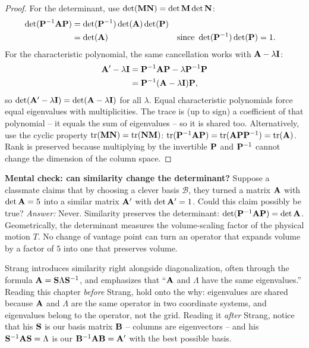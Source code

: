 \begin{proof}
For the determinant, use $\det(\mathbf{M}\mathbf{N})=\det\mathbf{M}\det\mathbf{N}$:
\begin{align*}
  \det(\mathbf{P}^{-1}\mathbf{A}\mathbf{P})
  &= \det(\mathbf{P}^{-1})\det(\mathbf{A})\det(\mathbf{P}) \\
  &= \det(\mathbf{A}) &&\text{since } \det(\mathbf{P}^{-1})\det(\mathbf{P})=1.
\end{align*}
For the characteristic polynomial, the same cancellation works with
$\mathbf{A}-\lambda\mathbf{I}$:
\begin{align*}
  \mathbf{A}'-\lambda\mathbf{I} &= \mathbf{P}^{-1}\mathbf{A}\mathbf{P}-\lambda\mathbf{P}^{-1}\mathbf{P} \\
  &= \mathbf{P}^{-1}(\mathbf{A}-\lambda\mathbf{I})\mathbf{P},
\end{align*}
so $\det(\mathbf{A}'-\lambda\mathbf{I})=\det(\mathbf{A}-\lambda\mathbf{I})$ for all $\lambda$.
Equal characteristic polynomials force equal eigenvalues with multiplicities. The
trace is (up to sign) a coefficient of that polynomial -- it equals the sum of
eigenvalues -- so it is shared too. Alternatively, use the cyclic property
$\operatorname{tr}(\mathbf{M}\mathbf{N})=\operatorname{tr}(\mathbf{N}\mathbf{M})$:
$\operatorname{tr}(\mathbf{P}^{-1}\mathbf{A}\mathbf{P})=\operatorname{tr}(\mathbf{A}\mathbf{P}\mathbf{P}^{-1})=\operatorname{tr}(\mathbf{A})$.
Rank is preserved because multiplying by the invertible $\mathbf{P}$ and $\mathbf{P}^{-1}$
cannot change the dimension of the column space.
\end{proof}

\begin{recoverybox}
\textbf{Mental check: can similarity change the determinant?}
Suppose a classmate claims that by choosing a clever basis $\mathcal{B}$, they turned a matrix $\mathbf{A}$ with $\det\mathbf{A} = 5$ into a similar matrix $\mathbf{A}'$ with $\det\mathbf{A}' = 1$. Could this claim possibly be true?
\emph{Answer:} Never. Similarity preserves the determinant: $\det(\mathbf{P}^{-1}\mathbf{A}\mathbf{P}) = \det\mathbf{A}$. Geometrically, the determinant measures the volume-scaling factor of the physical motion $T$. No change of vantage point can turn an operator that expands volume by a factor of $5$ into one that preserves volume.
\end{recoverybox}

\begin{strangbox}
Strang introduces similarity right alongside diagonalization, often through the
formula $\mathbf{A}=\mathbf{S}\Lambda\mathbf{S}^{-1}$, and emphasizes that ``$\mathbf{A}$ and
$\Lambda$ have the same eigenvalues.'' Reading this chapter \emph{before} Strang,
hold onto the why: eigenvalues are shared because $\mathbf{A}$ and $\Lambda$ are the
same operator in two coordinate systems, and eigenvalues belong to the
operator, not the grid. Reading it \emph{after} Strang, notice that his $\mathbf{S}$
is our basis matrix $\mathbf{B}$ -- columns are eigenvectors -- and his
$\mathbf{S}^{-1}\mathbf{A}\mathbf{S}=\Lambda$ is our $\mathbf{B}^{-1}\mathbf{A}\mathbf{B}=\mathbf{A}'$
with the best possible basis.
\end{strangbox}

